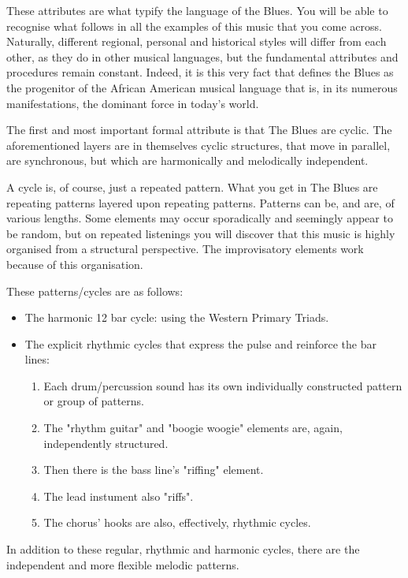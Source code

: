 \documentclass{article}
\begin{document}
These attributes are what typify the language of the Blues.
You will be able to recognise what follows in all the examples of this music that you come across.
Naturally, different regional, personal and historical styles will differ from each other, as they do in other musical languages, but the fundamental attributes and procedures remain constant.
Indeed, it is this very fact that defines the Blues as the progenitor of the African American musical language that is, in its numerous manifestations, the dominant force in today's world.

The first and most important formal attribute is that The Blues are cyclic.
The aforementioned layers are in themselves cyclic structures, that move in parallel, are synchronous, but which are harmonically and melodically independent.

A cycle is, of course, just a repeated pattern.
What you get in The Blues are repeating patterns layered upon repeating patterns.
Patterns can be, and are, of various lengths.
Some elements may occur sporadically and seemingly appear to be random, but on repeated listenings you will discover that this music is highly organised from a structural perspective.
The improvisatory elements work because of this organisation.

These patterns/cycles are as follows:

\begin{itemize}
    \item The harmonic 12 bar cycle: using the Western Primary Triads.
    \item The explicit rhythmic cycles that  express the pulse and reinforce the bar lines:
        \begin{enumerate}
            \item Each drum/percussion sound has its own individually constructed pattern or group of patterns.
            \item The "rhythm guitar" and "boogie woogie" elements are, again, independently structured.
            \item Then there is the bass line's "riffing" element.
            \item The lead instument also "riffs".
            \item The chorus' hooks are also, effectively, rhythmic cycles.
        \end{enumerate}
\end{itemize}

In addition to these regular, rhythmic and harmonic cycles, there are the independent and more flexible melodic patterns.
\end{document}
